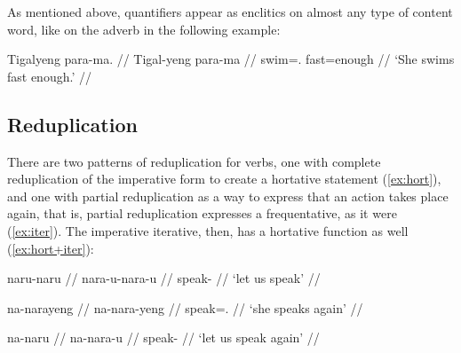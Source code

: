 As mentioned above, quantifiers appear as enclitics on almost any type of 
content word, like on the adverb  in the following example:

\ex
\begingl
	\gla Tigalyeng para-ma. //
	\glb Tigal-yeng para-ma //
	\glc swim=\TsgF{}.\Aarg{} fast=enough //
	\glft `She swims fast enough.' //
\endgl

% 
% 

\xe

\subsection{Reduplication}

There are two patterns of reduplication for verbs, one with complete 
reduplication of the imperative form to create a hortative statement 
(\ref{ex:hort}), and one with partial reduplication as a way to express that an 
action takes place again, that is, partial reduplication expresses a 
frequentative, as it were (\ref{ex:iter}). The imperative iterative, then, has a 
hortative function as well (\ref{ex:hort+iter}):

\begin{multicols}{2}
\pex
\a\label{ex:hort}\begingl%
	\gla naru-naru //
	\glb nara-u-nara-u //
	\glc speak-\Imp{}\til\Hort{} //
	\glft `let us speak' //
\endgl

\a\label{ex:iter}\begingl
	\gla na-narayeng //
	\glb na-nara-yeng //
	\glc \Iter{}\til{}speak=\TsgF{}.\Aarg{} //
	\glft `she speaks again' //
\endgl

\a\label{ex:hort+iter}\begingl
	\gla na-naru //
	\glb na-nara-u //
	\glc \Iter{}\til{}speak-\Imp{} //
	\glft `let us speak again' //
\endgl

\xe
\end{multicols}

